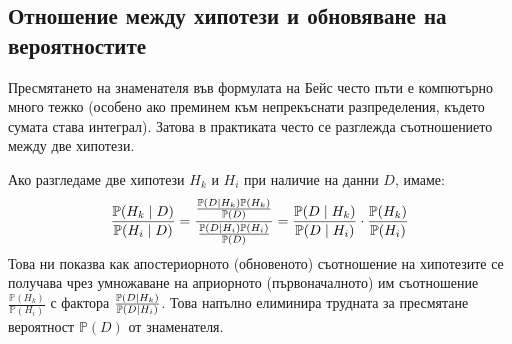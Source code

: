 \subsection{Отношение между хипотези и обновяване на вероятностите}

Пресмятането на знаменателя във формулата на Бейс често пъти е компютърно много тежко (особено ако преминем към непрекъснати разпределения, където сумата става интеграл). Затова в практиката често се разглежда съотношението между две хипотези.

Ако разгледаме две хипотези $H_k$ и $H_i$ при наличие на данни $D$, имаме:
\[
\frac{\mathbb{P}(H_k \mid D)}{\mathbb{P}(H_i \mid D)} = \frac{\frac{\mathbb{P}(D \mid H_k)\mathbb{P}(H_k)}{\mathbb{P}(D)}}{\frac{\mathbb{P}(D \mid H_i)\mathbb{P}(H_i)}{\mathbb{P}(D)}} = \frac{\mathbb{P}(D \mid H_k)}{\mathbb{P}(D \mid H_i)} \cdot \frac{\mathbb{P}(H_k)}{\mathbb{P}(H_i)}
\]
Това ни показва как апостериорното (обновеното) съотношение на хипотезите се получава чрез умножаване на априорното (първоначалното) им съотношение $\frac{\mathbb{P}(H_k)}{\mathbb{P}(H_i)}$ с фактора $\frac{\mathbb{P}(D \mid H_k)}{\mathbb{P}(D \mid H_i)}$. Това напълно елиминира трудната за пресмятане вероятност $\mathbb{P}(D)$ от знаменателя.

